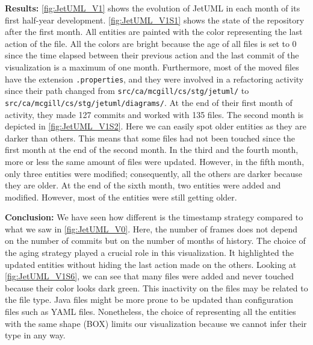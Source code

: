 \bigbreak
\noindent
\textbf{Results:}
\autoref{fig:JetUML_V1} shows the evolution of JetUML in each month of its first half-year development. \autoref{fig:JetUML_V1S1} shows the state of the repository after the first month. All entities are painted with the color representing the last action of the file. All the colors are bright because the age of all files is set to 0 since the time elapsed between their previous action and the last commit of the visualization is a maximum of one month. Furthermore, most of the moved files have the extension \texttt{.properties}, and they were involved in a refactoring activity since their path changed from \texttt{src/ca/mcgill/cs/stg/jetuml/} to \texttt{src/ca/mcgill/cs/stg/jetuml/diagrams/}.  At the end of their first month of activity, they made 127 commits and worked with 135 files. The second month is depicted in \autoref{fig:JetUML_V1S2}. Here we can easily spot older entities as they are darker than others. This means that some files had not been touched since the first month at the end of the second month. In the third and the fourth month, more or less the same amount of files were updated. However, in the fifth month, only three entities were modified; consequently, all the others are darker because they are older. 
At the end of the sixth month, two entities were added and modified. However, most of the entities were still getting older. 

\bigbreak
\noindent
\textbf{Conclusion:}
We have seen how different is the timestamp strategy compared to what we saw in \autoref{fig:JetUML_V0}. Here, the number of frames does not depend on the number of commits but on the number of months of history. 
The choice of the aging strategy played a crucial role in this visualization. It highlighted the updated entities without hiding the last action made on the others. Looking at \autoref{fig:JetUML_V1S6}, we can see that many files were added and never touched because their color looks dark green. This inactivity on the files may be related to the file type. Java files might be more prone to be updated than configuration files such as YAML files. Nonetheless, the choice of representing all the entities with the same shape (BOX) limits our visualization because we cannot infer their type in any way. 


